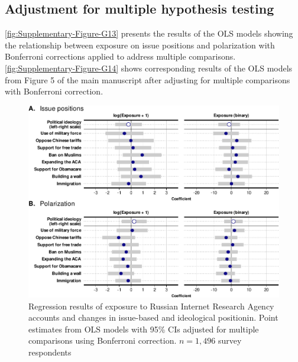 \documentclass[
  12pt,
]{article}
\begin{document}
\clearpage

\hypertarget{adjustment-for-multiple-hypothesis-testing}{%
\subsection{Adjustment for multiple hypothesis testing}\label{adjustment-for-multiple-hypothesis-testing}}

\autoref{fig:Supplementary-Figure-G13} presents the results of the OLS models showing the relationship between exposure on issue positions and polarization with Bonferroni corrections applied to address multiple comparisons. \autoref{fig:Supplementary-Figure-G14} shows corresponding results of the OLS models from Figure 5 of the main manuscript after adjusting for multiple comparisons with Bonferroni correction.

\begin{figure}
\centering
\includegraphics{Supplementary_Information_files/figure-latex/Supplementary-Figure-G13-1.pdf}
\caption{\label{fig:Supplementary-Figure-G13}Regression results of exposure to Russian Internet Research Agency accounts and changes in issue-based and ideological positionin. Point estimates from OLS models with 95\% CIs adjusted for multiple comparisons using Bonferroni correction. \(n = 1,496\) survey respondents}
\end{figure}
\end{document}
